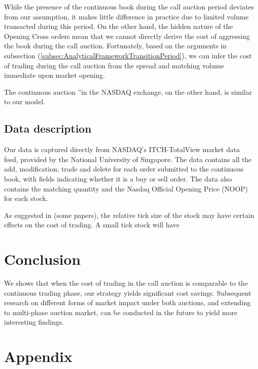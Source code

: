 \documentclass{article}
\begin{document}
While the presence of the continuous book during the call auction period deviates from our assumption, it makes little difference in practice due to limited volume transacted during this period. On the other hand, the hidden nature of the Opening Cross orders mean that we cannot directly derive the cost of aggressing the book during the call auction. Fortunately, based on the arguments in subsection (\ref{subsec:AnalyticalFrameworkTransitionPeriod}), we can infer the cost of trading during the call auction from the spread and matching volume immediate upon market opening.

The continuous auction ''in the NASDAQ exchange, on the other hand, is similar to our model.

\subsection{Data description}

Our data is captured directly from NASDAQ's ITCH-TotalView market data feed, provided by the National University of Singapore. The data contains all the add, modification, trade and delete for each order submitted to the continuous book, with fields indicating whether it is a buy or sell order. The data also contains the matching quantity and the Nasdaq Official Opening Price (NOOP) for each stock.

As suggested in (some papers), the relative tick size of the stock may have certain effects on the cost of trading. A small tick stock will have 

\section{Conclusion}\label{secConclusion}
We shows that when the cost of trading in the call auction is comparable to the continuous trading phase, our strategy yields significant cost savings. Subsequent research on different forms of market impact under both auctions, and extending to multi-phase auction market, can be conducted in the future to yield more interesting findings.

\section{Appendix}
\end{document}
